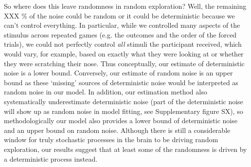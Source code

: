 \documentclass[12pt]{article}
\begin{document}
	So where does this leave randomness in random exploration? Well, the remaining XXX \% of the noise could be random or it could be deterministic because we can't control everything. In particular, while we controlled many aspects of the stimulus across repeated games (e.g. the outcomes and the order of the forced trials), we could not perfectly control {\it all} stimuli the participant received, which would vary, for example, based on exactly what they were looking at or whether they were scratching their nose. Thus conceptually, our estimate of deterministic noise is a lower bound. Conversely, our estimate of random noise is an upper bound as these `missing' sources of deterministic noise would be interpreted as random noise in our model. In addition, our estimation method also systematically underestimate deterministic noise (part of the deterministic noise will show up as random noise in model fitting, see Supplementary figure SX), so methodologically our model also provides a lower bound of deterministic noise and an upper bound on random noise. Although there is still a considerable window for truly stochastic processes in the brain to be driving random exploration, our results suggest that at least some of the randomness is driven by a deterministic process instead.
	
	
	
\end{document}

